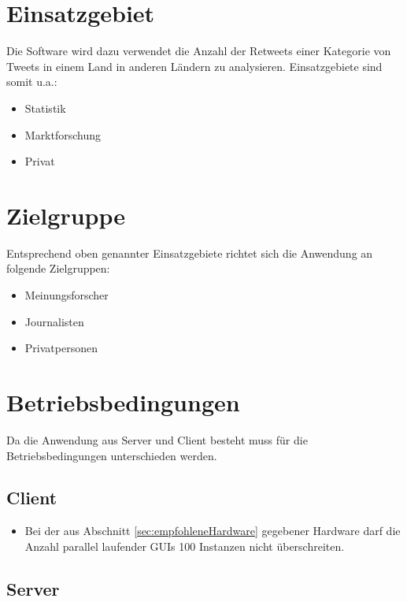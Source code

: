 \section{Einsatzgebiet}
Die Software wird dazu verwendet die Anzahl der Retweets einer Kategorie von Tweets in einem Land in anderen Ländern zu analysieren. Einsatzgebiete sind somit u.a.:
\begin{itemize}
	\item Statistik
	\item Marktforschung
	\item Privat
\end{itemize}
\section{Zielgruppe}
Entsprechend oben genannter Einsatzgebiete richtet sich die Anwendung an folgende Zielgruppen:
\begin{itemize}
	\item Meinungsforscher
	\item Journalisten
	\item Privatpersonen
\end{itemize}
\section{Betriebsbedingungen}
Da die Anwendung aus Server und Client besteht muss für die Betriebsbedingungen unterschieden werden.
\subsection{Client}
\begin{itemize}
				\item Bei der aus Abschnitt \ref{sec:empfohleneHardware} gegebener Hardware darf die Anzahl parallel laufender GUIs 100 Instanzen nicht überschreiten.
\end{itemize}
\subsection{Server}
